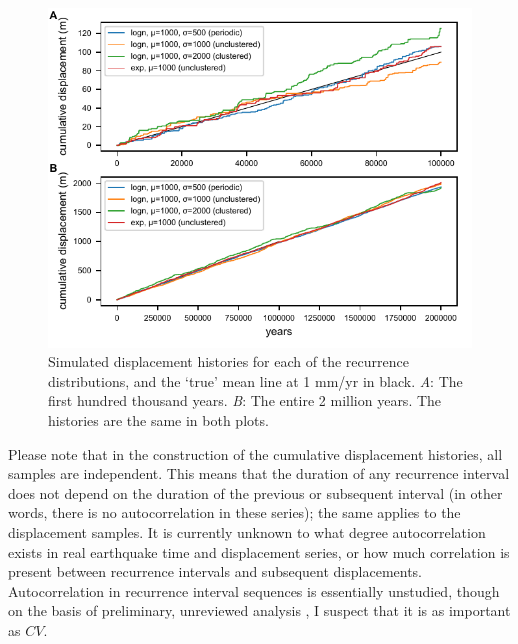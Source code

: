 \documentclass[se]{copernicus}
\begin{document}
\begin{figure}[t]
  \includegraphics[width=12cm]{./figures/disp_histories.pdf}
  \caption{Simulated displacement histories for each of the recurrence 
  distributions, and the `true' mean line at 1 mm/yr in black. \emph{A}: The 
  first hundred thousand years. \emph{B}: The entire 2 million years. The 
  histories are the same in both plots. \label{disp_histories}}
\end{figure}



Please note that in the construction of the cumulative displacement
histories, all samples are independent. This means that the duration of any
recurrence interval does not depend on the duration of the previous or
subsequent interval (in other words, there is no autocorrelation in these
series); the same applies to the displacement samples. It is currently unknown 
to what degree autocorrelation exists in
real earthquake time and displacement series, or how much correlation is
present between recurrence intervals and subsequent displacements.
Autocorrelation in recurrence interval sequences is essentially unstudied,
though on the basis of preliminary, unreviewed analysis
\citep{styron_survival_2017}, I suspect that it is as important as \(CV\).
\end{document}
